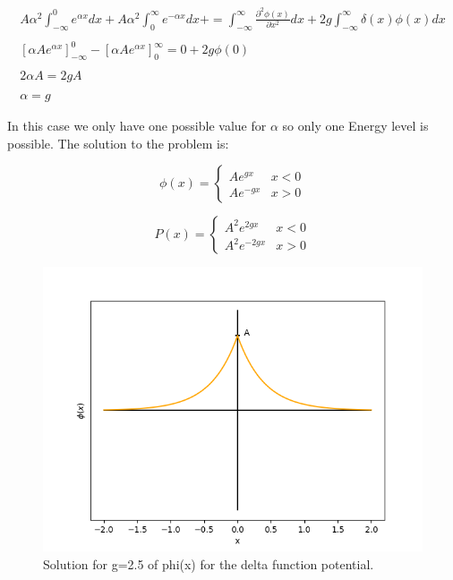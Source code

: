 \begin{equation}
    \label{4.11}
        \begin{array}{c}
            A\alpha^2\int_{-\infty}^{0}e^{\alpha x}dx+ A \alpha^2\int_{0}^{\infty}e^{-\alpha x}dx+ = \int_{-\infty}^{\infty} \frac{\partial^2\phi(x)}{\partial x^2} dx + 2g\int_{-\infty}^{\infty}\delta(x)\phi(x)dx
            \\

            \\
            \left[\alpha Ae^{\alpha x}\right]_{-\infty}^{0}-\left[\alpha Ae^{\alpha x}\right]_{0}^{\infty} = 0 + 2g\phi(0)
            \\

            \\
            2\alpha A = 2gA
            \\

            \\
            \alpha = g
        \end{array}
\end{equation}

In this case we only have one possible value for $\alpha$ so only one Energy level is possible. The solution to the problem is:

\begin{equation}
\label{4.12}
\phi(x) = \left\{ \begin{array}{lc}
     Ae^{gx}    &   x<0  \\
     Ae^{-gx}   &   x>0
\end{array}\right.
\end{equation}

\begin{equation}
\label{4.13}
P(x) = \left\{ \begin{array}{lc}
     A^2e^{2gx}    &  x<0  \\
     A^2e^{-2gx}   &  x>0
\end{array}\right.
\end{equation}

\begin{figure}
  \includegraphics{images4/phi(x).png}
  \centering
  \caption{Solution for g=2.5 of phi(x) for the delta function potential.}
\end{figure}


